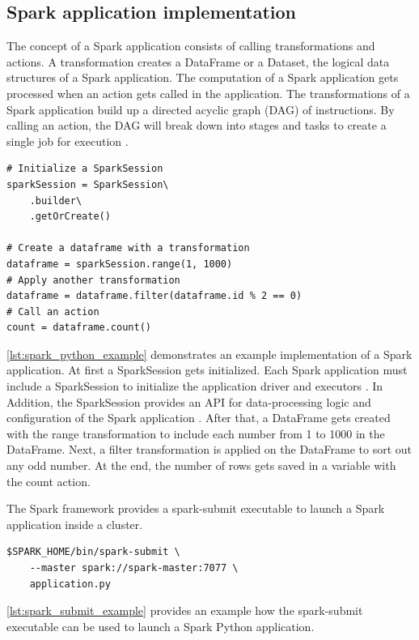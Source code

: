 \subsection{Spark application implementation}
The concept of a Spark application consists of calling transformations and actions. A transformation creates a DataFrame or a Dataset, the logical data structures of a Spark application. The computation of a Spark application gets processed when an action gets called in the application. The transformations of a Spark application build up a directed acyclic graph (DAG) of instructions. By calling an action, the DAG will break down into stages and tasks to create a single job for execution \cite{Chambers2018Spark}.
\begin{lstlisting}[frame=single, label=lst:spark_python_example, caption=Example of a Python3 Spark application, captionpos=b]
# Initialize a SparkSession
sparkSession = SparkSession\
    .builder\
    .getOrCreate()

# Create a dataframe with a transformation
dataframe = sparkSession.range(1, 1000)
# Apply another transformation
dataframe = dataframe.filter(dataframe.id % 2 == 0)
# Call an action
count = dataframe.count()
\end{lstlisting}
\ref{lst:spark_python_example} demonstrates an example implementation of a Spark application. At first a SparkSession gets initialized. Each Spark application must include a SparkSession to initialize the application driver and executors  \cite{Chambers2018Spark}. In Addition, the SparkSession provides an API for data-processing logic and configuration of the Spark application \cite{Hien2018Spark}. After that, a DataFrame gets created with the range transformation to include each number from 1 to 1000 in the DataFrame. Next, a filter transformation is applied on the DataFrame to sort out any odd number. At the end, the number of rows gets saved in a variable with the count action.
\todo{Create listing macro}



The Spark framework provides a spark-submit executable to launch a Spark application inside a cluster.
\begin{lstlisting}[frame=single, label=lst:spark_submit_example, caption=Execution of a Spark Python application using the spark-submit executable, captionpos=b]
$SPARK_HOME/bin/spark-submit \
    --master spark://spark-master:7077 \
    application.py
\end{lstlisting}
\ref{lst:spark_submit_example} provides an example how the spark-submit executable can be used to launch a Spark Python application.


